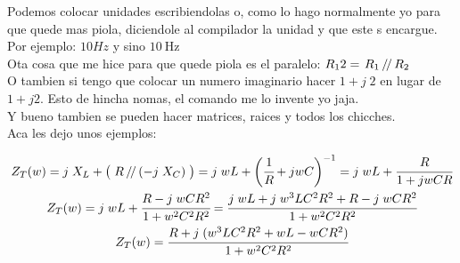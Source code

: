 \documentclass[a4paper,12pt]{article}
\newcommand{\im}[1]{j\; #1}
\newcommand{\parallelTwo}[2]{\left.#1\,\middle/\!\middle/\,#2\right.}
\begin{document}
            Podemos colocar unidades escribiendolas o, como lo hago normalmente yo para que quede mas piola, diciendole 
            al compilador la unidad y que este s encargue. \\
            Por ejemplo: $10 Hz$ y sino $\SI{10}{\hertz}$ \\

            Ota cosa que me hice para que quede piola es el paralelo: $R_12 = \parallelTwo{R_1}{R_2}$ \\
            O tambien si tengo que colocar un numero imaginario hacer $1 + \im{2}$ en lugar de $1 + j2$. 
            Esto de hincha nomas, el comando me lo invente yo jaja. \\


            Y bueno tambien se pueden hacer matrices, raices y todos los chicches. \\
            Aca les dejo unos ejemplos:

            \begin{gather*}
                Z_T(w) = \im{X_L} + \big( \parallelTwo{R}{(-\im{X_C})} \big)
                    = \im{wL} + \bigg( \cfrac{1}{R} + jwC \bigg)^{-1} = \im{wL} + \cfrac{R}{1+jwCR} \\
                Z_T(w) = \im{wL} + \cfrac{R-\im{wCR^2}} {1+w^2C^2R^2}
                    = \cfrac{ \im{wL} + \im{w^3LC^2R^2} + R - \im{wCR^2} } { 1 + w^2C^2R^2 } \\
                Z_T(w) = \cfrac{ R + \im{( w^3LC^2R^2 + wL - wCR^2 )} } { 1 + w^2C^2R^2 }
            \end{gather*}
\end{document}
